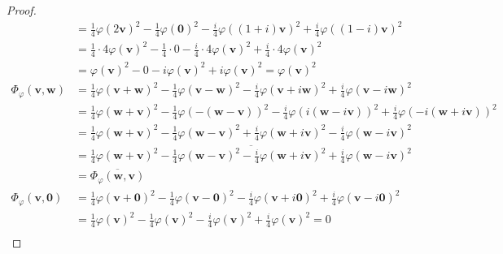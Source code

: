 \documentclass[dvipdfmx]{jsarticle}
\begin{document}
\begin{proof}
\begin{align*}
&= \frac{1}{4}{\varphi\left( 2\mathbf{v} \right)}^{2} - \frac{1}{4}{\varphi\left( \mathbf{0} \right)}^{2} - \frac{i}{4}{\varphi\left( (1 + i)\mathbf{v} \right)}^{2} + \frac{i}{4}{\varphi\left( (1 - i)\mathbf{v} \right)}^{2}\\
&= \frac{1}{4} \cdot 4{\varphi\left( \mathbf{v} \right)}^{2} - \frac{1}{4} \cdot 0 - \frac{i}{4} \cdot 4{\varphi\left( \mathbf{v} \right)}^{2} + \frac{i}{4} \cdot 4{\varphi\left( \mathbf{v} \right)}^{2}\\
&= {\varphi\left( \mathbf{v} \right)}^{2} - 0 - i{\varphi\left( \mathbf{v} \right)}^{2} + i{\varphi\left( \mathbf{v} \right)}^{2} = {\varphi\left( \mathbf{v} \right)}^{2}\\
\varPhi_{\varphi}\left( \mathbf{v},\mathbf{w} \right) &= \frac{1}{4}{\varphi\left( \mathbf{v} + \mathbf{w} \right)}^{2} - \frac{1}{4}{\varphi\left( \mathbf{v} - \mathbf{w} \right)}^{2} - \frac{i}{4}{\varphi\left( \mathbf{v} + i\mathbf{w} \right)}^{2} + \frac{i}{4}{\varphi\left( \mathbf{v} - i\mathbf{w} \right)}^{2}\\
&= \frac{1}{4}{\varphi\left( \mathbf{w} + \mathbf{v} \right)}^{2} - \frac{1}{4}{\varphi\left( - \left( \mathbf{w} - \mathbf{v} \right) \right)}^{2} - \frac{i}{4}{\varphi\left( i\left( \mathbf{w} - i\mathbf{v} \right) \right)}^{2} + \frac{i}{4}{\varphi\left( - i\left( \mathbf{w} + i\mathbf{v} \right) \right)}^{2}\\
&= \frac{1}{4}{\varphi\left( \mathbf{w} + \mathbf{v} \right)}^{2} - \frac{1}{4}{\varphi\left( \mathbf{w} - \mathbf{v} \right)}^{2} + \frac{i}{4}{\varphi\left( \mathbf{w} + i\mathbf{v} \right)}^{2} - \frac{i}{4}{\varphi\left( \mathbf{w} - i\mathbf{v} \right)}^{2}\\
&= \overline{\frac{1}{4}{\varphi\left( \mathbf{w} + \mathbf{v} \right)}^{2} - \frac{1}{4}{\varphi\left( \mathbf{w} - \mathbf{v} \right)}^{2} - \frac{i}{4}{\varphi\left( \mathbf{w} + i\mathbf{v} \right)}^{2} + \frac{i}{4}{\varphi\left( \mathbf{w} - i\mathbf{v} \right)}^{2}}\\
&= \overline{\varPhi_{\varphi}\left( \mathbf{w},\mathbf{v} \right)}\\
\varPhi_{\varphi}\left( \mathbf{v},\mathbf{0} \right) &= \frac{1}{4}{\varphi\left( \mathbf{v} + \mathbf{0} \right)}^{2} - \frac{1}{4}{\varphi\left( \mathbf{v} - \mathbf{0} \right)}^{2} - \frac{i}{4}{\varphi\left( \mathbf{v} + i\mathbf{0} \right)}^{2} + \frac{i}{4}{\varphi\left( \mathbf{v} - i\mathbf{0} \right)}^{2}\\
&= \frac{1}{4}{\varphi\left( \mathbf{v} \right)}^{2} - \frac{1}{4}{\varphi\left( \mathbf{v} \right)}^{2} - \frac{i}{4}{\varphi\left( \mathbf{v} \right)}^{2} + \frac{i}{4}{\varphi\left( \mathbf{v} \right)}^{2} = 0\\

\end{align*}
\end{proof}
\end{document}

